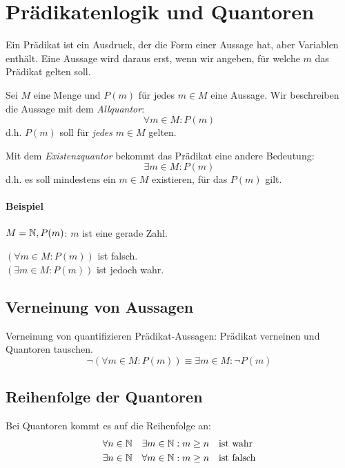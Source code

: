 \section{Prädikatenlogik und Quantoren}
Ein Prädikat ist ein Ausdruck, der die Form einer Aussage hat, aber Variablen enthält.
Eine Aussage wird daraus erst, wenn wir angeben, für welche $m$ das Prädikat gelten soll.

Sei $M$ eine Menge und $P(m)$ für jedes $m\in M$ eine Aussage. Wir beschreiben die Aussage mit dem \emph{Allquantor}:
\begin{equation*}
  \forall m\in M: P(m)
\end{equation*}
d.h. $P(m)$ soll für \emph{jedes} $m\in M$ gelten.
\par\medskip
Mit dem \emph{Existenzquantor} bekommt das Prädikat eine andere Bedeutung:
\begin{equation*}
  \exists m\in M: P(m)
\end{equation*}
d.h. es soll mindestens ein $m\in M$ existieren, für das $P(m)$ gilt.

\paragraph{Beispiel}
$M=\mathbb{N}, P(m)$: \glqq $m$ ist eine gerade Zahl.\grqq

$(\forall m\in M: P(m))$ ist falsch. \\
$(\exists m\in M: P(m))$ ist jedoch wahr.

\subsection{Verneinung von Aussagen}
Verneinung von quantifizieren Prädikat-Aussagen:
\glqq Prädikat verneinen und Quantoren tauschen.\grqq
\begin{equation*}
  \neg(\forall m\in M: P(m)) \equiv  \exists m\in M: \neg P(m)
\end{equation*}
\subsection{Reihenfolge der Quantoren}
Bei Quantoren kommt es auf die Reihenfolge an:
\begin{align*}
  \forall n\in\mathbb{N} \quad\exists m\in \mathbb{N} &: m\geq n \quad\text{ist wahr}\\
  \exists n\in\mathbb{N} \quad\forall m\in \mathbb{N} &: m\geq n \quad\text{ist falsch}\\
\end{align*}


